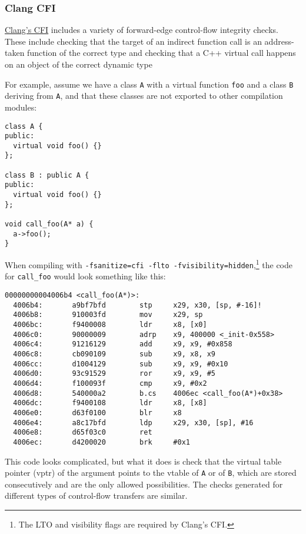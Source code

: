 \documentclass[a4paper,]{report}
\begin{document}
\hypertarget{clang-cfi}{%
\subsubsection{Clang CFI}\label{clang-cfi}}

\href{https://clang.llvm.org/docs/ControlFlowIntegrity.html}{Clang's
CFI} includes a variety of forward-edge control-flow integrity checks.
These include checking that the target of an indirect function call is
an address-taken function of the correct type and checking that a C++
 virtual call happens on an object of the correct dynamic
type

For example, assume we have a class \texttt{A} with a virtual function
\texttt{foo} and a class \texttt{B} deriving from \texttt{A}, and that
these classes are not exported to other compilation modules:

\begin{verbatim}
class A {
public:
  virtual void foo() {}
};

class B : public A {
public:
  virtual void foo() {}
};

void call_foo(A* a) {
  a->foo();
}
\end{verbatim}

When compiling with
\texttt{-fsanitize=cfi\ -flto\ -fvisibility=hidden},\footnote{The LTO
  and visibility flags are required by Clang's CFI.} the code for
\texttt{call\_foo} would look something like this:

\begin{verbatim}
00000000004006b4 <call_foo(A*)>:
  4006b4:       a9bf7bfd        stp     x29, x30, [sp, #-16]!
  4006b8:       910003fd        mov     x29, sp
  4006bc:       f9400008        ldr     x8, [x0]
  4006c0:       90000009        adrp    x9, 400000 <_init-0x558>
  4006c4:       91216129        add     x9, x9, #0x858
  4006c8:       cb090109        sub     x9, x8, x9
  4006cc:       d1004129        sub     x9, x9, #0x10
  4006d0:       93c91529        ror     x9, x9, #5
  4006d4:       f100093f        cmp     x9, #0x2
  4006d8:       540000a2        b.cs    4006ec <call_foo(A*)+0x38>
  4006dc:       f9400108        ldr     x8, [x8]
  4006e0:       d63f0100        blr     x8
  4006e4:       a8c17bfd        ldp     x29, x30, [sp], #16
  4006e8:       d65f03c0        ret
  4006ec:       d4200020        brk     #0x1
\end{verbatim}

This code looks complicated, but what it does is check that the virtual
table pointer (vptr) of the argument points to the vtable of \texttt{A}
or of \texttt{B}, which are stored consecutively and are the only
allowed possibilities. The checks generated for different types of
control-flow transfers are similar.
\end{document}
